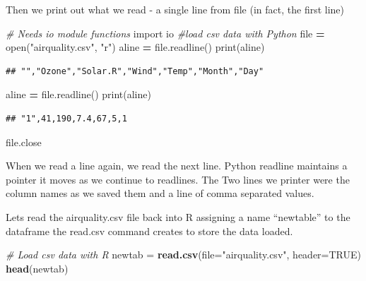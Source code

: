 \documentclass[]{book}
\newenvironment{Shaded}{\begin{snugshade}}{\end{snugshade}}
\newcommand{\KeywordTok}[1]{\textcolor[rgb]{0.13,0.29,0.53}{\textbf{#1}}}
\newcommand{\DataTypeTok}[1]{\textcolor[rgb]{0.13,0.29,0.53}{#1}}
\newcommand{\StringTok}[1]{\textcolor[rgb]{0.31,0.60,0.02}{#1}}
\newcommand{\ImportTok}[1]{#1}
\newcommand{\CommentTok}[1]{\textcolor[rgb]{0.56,0.35,0.01}{\textit{#1}}}
\newcommand{\OtherTok}[1]{\textcolor[rgb]{0.56,0.35,0.01}{#1}}
\newcommand{\OperatorTok}[1]{\textcolor[rgb]{0.81,0.36,0.00}{\textbf{#1}}}
\newcommand{\BuiltInTok}[1]{#1}
\newcommand{\NormalTok}[1]{#1}
\theoremstyle{definition}
\theoremstyle{definition}
\theoremstyle{definition}
\theoremstyle{remark}
\begin{document}
Then we print out what we read - a single line from file (in fact, the
first line)

\begin{Shaded}
\begin{Highlighting}[]
\CommentTok{# Needs io module functions}
\ImportTok{import}\NormalTok{ io}
\CommentTok{#load csv data with Python }
\BuiltInTok{file} \OperatorTok{=} \BuiltInTok{open}\NormalTok{(}\StringTok{"airquality.csv"}\NormalTok{, }\StringTok{"r"}\NormalTok{)}
\NormalTok{aline }\OperatorTok{=} \BuiltInTok{file}\NormalTok{.readline()}
\BuiltInTok{print}\NormalTok{(aline)}
\end{Highlighting}
\end{Shaded}

\begin{verbatim}
## "","Ozone","Solar.R","Wind","Temp","Month","Day"
\end{verbatim}

\begin{Shaded}
\begin{Highlighting}[]
\NormalTok{aline }\OperatorTok{=} \BuiltInTok{file}\NormalTok{.readline()}
\BuiltInTok{print}\NormalTok{(aline)}
\end{Highlighting}
\end{Shaded}

\begin{verbatim}
## "1",41,190,7.4,67,5,1
\end{verbatim}

\begin{Shaded}
\begin{Highlighting}[]
\BuiltInTok{file}\NormalTok{.close}
\end{Highlighting}
\end{Shaded}

When we read a line again, we read the next line. Python readline
maintains a pointer it moves as we continue to readlines. The Two lines
we printer were the column names as we saved them and a line of comma
separated values.

Lets read the airquality.csv file back into R assigning a name
``newtable'' to the dataframe the read.csv command creates to store the
data loaded.

\begin{Shaded}
\begin{Highlighting}[]
\CommentTok{# Load csv data with R}
\NormalTok{newtab =}\StringTok{ }\KeywordTok{read.csv}\NormalTok{(}\DataTypeTok{file=}\StringTok{"airquality.csv"}\NormalTok{, }\DataTypeTok{header=}\OtherTok{TRUE}\NormalTok{)}
\KeywordTok{head}\NormalTok{(newtab)}
\end{Highlighting}
\end{Shaded}
\end{document}
